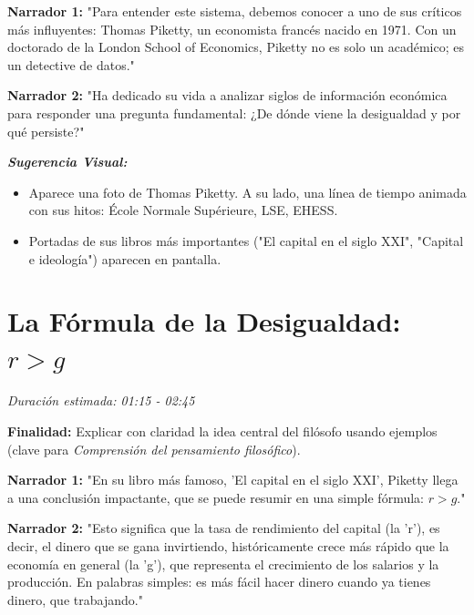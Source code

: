 \documentclass[12pt, a4paper]{article}
\begin{document}
\vspace{0.5cm}

\textbf{Narrador 1:}
"Para entender este sistema, debemos conocer a uno de sus críticos más influyentes: Thomas Piketty, un economista francés nacido en 1971. Con un doctorado de la London School of Economics, Piketty no es solo un académico; es un detective de datos."

\vspace{0.5cm}

\textbf{Narrador 2:}
"Ha dedicado su vida a analizar siglos de información económica para responder una pregunta fundamental: ¿De dónde viene la desigualdad y por qué persiste?"

\vspace{0.5cm}

\textit{\textbf{Sugerencia Visual:}} 
\begin{itemize}
    \item Aparece una foto de Thomas Piketty. A su lado, una línea de tiempo animada con sus hitos: École Normale Supérieure, LSE, EHESS.
    \item Portadas de sus libros más importantes ("El capital en el siglo XXI", "Capital e ideología") aparecen en pantalla.
\end{itemize}


\section{La Fórmula de la Desigualdad: \( r > g \)}
\textit{Duración estimada: 01:15 - 02:45}

\textbf{Finalidad:} Explicar con claridad la idea central del filósofo usando ejemplos (clave para \textit{Comprensión del pensamiento filosófico}).

\vspace{0.5cm}

\textbf{Narrador 1:}
"En su libro más famoso, 'El capital en el siglo XXI', Piketty llega a una conclusión impactante, que se puede resumir en una simple fórmula: \( r > g \)."

\vspace{0.5cm}

\textbf{Narrador 2:}
"Esto significa que la tasa de rendimiento del capital (la 'r'), es decir, el dinero que se gana invirtiendo, históricamente crece más rápido que la economía en general (la 'g'), que representa el crecimiento de los salarios y la producción. En palabras simples: es más fácil hacer dinero cuando ya tienes dinero, que trabajando."
\end{document}
